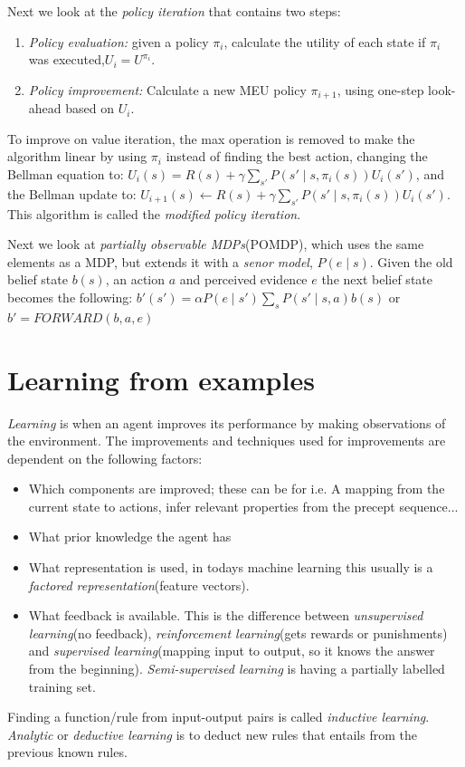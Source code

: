 \documentclass[11pt, letterpaper]{report}
\numberwithin{equation}{section}
\begin{document}
Next we look at the \emph{policy iteration} that contains two steps:
\begin{enumerate}
\item \emph{Policy evaluation:} given a policy $\pi_i$, calculate the utility of
  each state if $\pi_i$ was executed,$U_i=U^{\pi_i}$.
\item \emph{Policy improvement:} Calculate a new MEU policy $\pi_{i+1}$, using
  one-step look-ahead based on $U_i$.
\end{enumerate}
To improve on value iteration, the max operation is removed to make the
algorithm linear by using $\pi_i$ instead of finding the best action, changing
the Bellman equation to: $U_i(s) = R(s) + \gamma \sum_{s'} P(s' \mid s,
\pi_i(s))U_i(s')$, and the Bellman update to: $U_{i+1}(s) \leftarrow R(s) + \gamma \sum_{s'}
P(s' \mid s, \pi_i(s))U_i(s')$. This algorithm is called the \emph{modified
  policy iteration}.

Next we look at \emph{partially observable MDPs}(POMDP), which uses the same
elements as a MDP, but extends it with a \emph{senor model}, $P(e \mid s)$.
Given the old belief state $b(s)$, an action $a$ and perceived evidence $e$ the
next belief state becomes the following: $b'(s') = \alpha P(e \mid s') \sum_s
P(s'\mid s,a)b(s)$ or $b' = FORWARD(b,a,e)$

\section{Learning from examples}
\emph{Learning} is when an agent improves its performance by making observations
of the environment. The improvements and techniques used for improvements are
dependent on the following factors:
\begin{itemize}
\item Which components are improved; these can be for i.e. A mapping from
  the current state to actions, infer relevant properties from the precept sequence...
\item What prior knowledge the agent has
\item What representation is used, in todays machine learning this usually is a
  \emph{factored representation}(feature vectors).
\item What feedback is available. This is the difference between
  \emph{unsupervised learning}(no feedback), \emph{reinforcement learning}(gets
  rewards or punishments) and \emph{supervised learning}(mapping input to
  output, so it knows the answer from the beginning). \emph{Semi-supervised
    learning} is having a partially labelled training set.
\end{itemize}
Finding a function/rule from input-output pairs is called \emph{inductive
  learning}. \emph{Analytic} or \emph{deductive learning} is to deduct new rules
that entails from the previous known rules.
\end{document}
